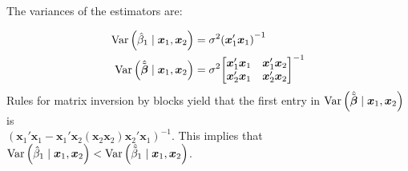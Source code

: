 \noindent The variances of the estimators are: 

\begin{align}
	\operatorname{Var} \left( \hat{\beta}_1 \mid \bm{x}_{1}, \bm{x}_{2}\right) & = \sigma^2 {\left( \bm{x}_{1}' \bm{x}_{1} \right)}^{-1} \nonumber \\
	\operatorname{Var} \left( \hat{\tilde{\bm{\beta}}} \mid \bm{x}_{1}, \bm{x}_{2}\right) & = \sigma^2 {\begin{bmatrix}
 								\bm{x}_{1}' \bm{x}_{1} & \bm{x}_{1}' \bm{x}_{2} \\ 
 								\bm{x}_{2}' \bm{x}_{1} & \bm{x}_{2}' \bm{x}_{2} 
 							\end{bmatrix}}^{-1}
\end{align}
\noindent Rules for matrix inversion by blocks yield that the first entry in $\operatorname{Var} \left( \hat{\tilde{\bm{\beta}}} \mid \bm{x}_{1}, \bm{x}_{2}\right)$ is\\ $ { \left( \bm{x}_1' \bm{x}_1 - \bm{x}_1' \bm{x}_2 \left( \bm{x}_2 \bm{x}_2 \right) \bm{x}_2' \bm{x}_1  \right) }^{-1}$. This implies that $\operatorname{Var} \left( \hat{\beta}_1 \mid \bm{x}_{1}, \bm{x}_{2}\right) < \operatorname{Var} \left( \hat{\tilde{\beta}}_1 \mid \bm{x}_{1}, \bm{x}_{2}\right)$. 
